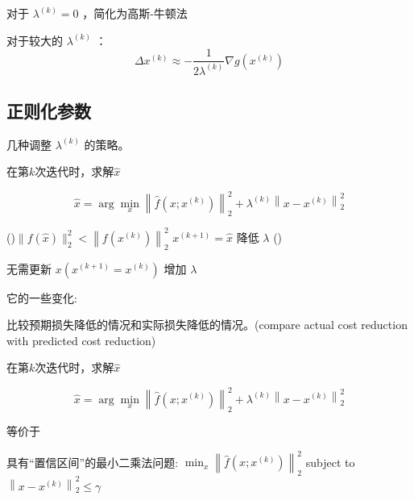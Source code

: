 \begin{theorem}
    对于 $ \lambda^{(k)}=0 $ ，简化为高斯-牛顿法
\end{theorem}

\begin{theorem}
    对于较大的 $ \lambda^{(k)} $ ：
$$
\Delta x^{(k)} \approx-\frac{1}{2 \lambda^{(k)}} \nabla g\left(x^{(k)}\right)
$$
\end{theorem}



\subsection{正则化参数}

几种调整 $ \lambda^{(k)} $ 的策略。

\begin{algorithm}[htbp]
    \caption{在第$k$次迭代时，求解$\hat{x}$}
    $$
    \hat{x}=\arg \min _{x}\left\|\hat{f}\left(x ; x^{(k)}\right)\right\|_{2}^{2}+\lambda^{(k)}\left\|x-x^{(k)}\right\|_{2}^{2}
    $$\;
    

    \If(){$ \|f(\hat{x})\|_{2}^{2}<\left\|f\left(x^{(k)}\right)\right\|_{2}^{2} $}{
        $ x^{(k+1)}=\hat{x} $\;
        降低 $ \lambda $
    }
    \Else(){
        无需更新 $ x \left(x^{(k+1)}=x^{(k)}\right) $\;
        增加 $ \lambda $\;

    }
\end{algorithm}

它的一些变化:

\begin{example}
    比较预期损失降低的情况和实际损失降低的情况。(compare actual cost reduction with predicted cost reduction)
\end{example}

\begin{theorem}
    在第$k$次迭代时，求解$\hat{x}$

    $$
    \hat{x}=\arg \min _{x}\left\|\hat{f}\left(x ; x^{(k)}\right)\right\|_{2}^{2}+\lambda^{(k)}\left\|x-x^{(k)}\right\|_{2}^{2}
    $$

    等价于

    具有“置信区间”的最小二乘法问题:
    $ \min _{x}\left\|\hat{f}\left(x ; x^{(k)}\right)\right\|_{2}^{2} $
    subject to $ \left\|x-x^{(k)}\right\|_{2}^{2} \leq \gamma $
\end{theorem}



